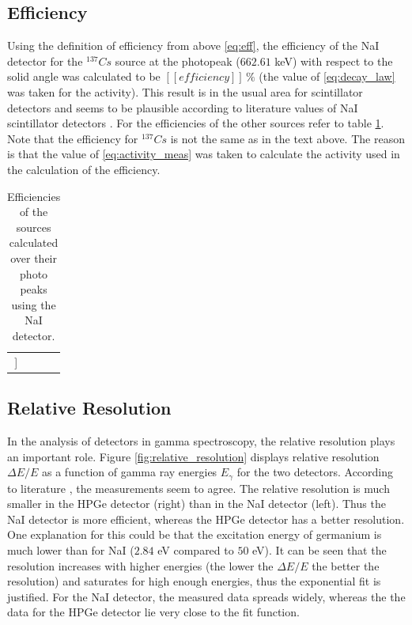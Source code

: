 \documentclass[a4paper]{article}
\begin{document}
\subsection{Efficiency}

Using the definition of efficiency from above \eqref{eq:eff}, the efficiency of the NaI detector for the $^{137}Cs$ source at the photopeak ($662.61$ keV) with respect to the solid angle was calculated to be $[[efficiency]] \, \%$ (the value of \eqref{eq:decay_law} was taken for the activity). This result is in the usual area for scintillator detectors and seems to be plausible according to literature values of NaI scintillator detectors \cite{hossain2011}. For the efficiencies of the other sources refer to table \ref{tab:efficiencies}. Note that the efficiency for $^{137}Cs$ is not the same as in the text above. The reason is that the value of \eqref{eq:activity_meas} was taken to calculate the activity used in the calculation of the efficiency.

\begin{table}[H]
\centering
\caption{Efficiencies of the sources calculated over their photo peaks using the NaI detector.}
\begin{tabular}{rr|rr}
\hline
[[table:efficiencies]]
\end{tabular}
\label{tab:efficiencies}
\end{table}

\subsection{Relative Resolution}

In the analysis of detectors in gamma spectroscopy, the relative resolution plays an important role. Figure \ref{fig:relative_resolution} displays relative resolution $\Delta E/E$ as a function of gamma ray energies $E_{\gamma}$ for the two detectors. According to literature \cite{hossain2011}, the measurements seem to agree. The relative resolution is much smaller in the HPGe detector (right) than in the NaI detector (left). Thus the NaI detector is more efficient, whereas the HPGe detector has a better resolution. One explanation for this could be that the excitation energy of germanium is much lower than for NaI ($2.84$ eV compared to $50$ eV). It can be seen that the resolution increases with higher energies (the lower the $\Delta E/E$ the better the resolution) and saturates for high enough energies, thus the exponential fit is justified. For the NaI detector, the measured data spreads widely, whereas the the data for the HPGe detector lie very close to the fit function.
\end{document}
